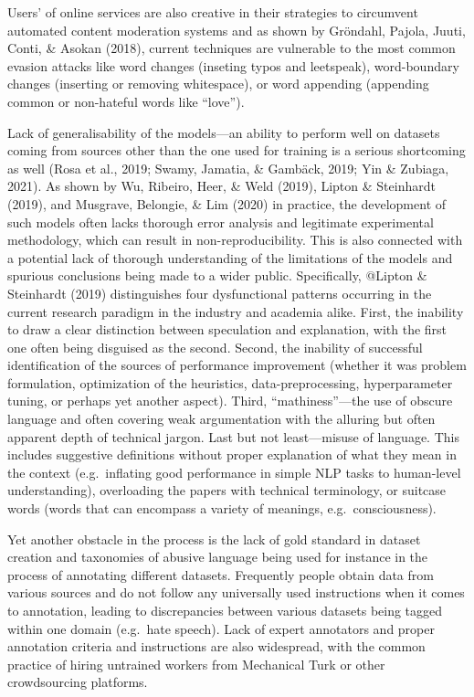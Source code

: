 \documentclass[
  10pt,
  dvipsnames,enabledeprecatedfontcommands]{scrartcl}
\begin{document}
Users' of online
services are also creative in their strategies to circumvent automated
content moderation systems and as shown by Gröndahl, Pajola, Juuti,
Conti, \& Asokan (2018), current techniques are vulnerable to the most
common evasion attacks like word changes (inseting typos and leetspeak),
word-boundary changes (inserting or removing whitespace), or word
appending (appending common or non-hateful words like ``love'').

Lack of
generalisability of the models---an ability to perform well on datasets
coming from sources other than the one used for training is a serious
shortcoming as well (Rosa et al., 2019; Swamy, Jamatia, \& Gambäck,
2019; Yin \& Zubiaga, 2021). As shown by Wu, Ribeiro, Heer, \& Weld
(2019), Lipton \& Steinhardt (2019), and Musgrave, Belongie, \& Lim
(2020) in practice, the development of such models often lacks thorough
error analysis and legitimate experimental methodology, which can result
in non-reproducibility. This is also connected with a potential lack of
thorough understanding of the limitations of the models and spurious
conclusions being made to a wider public. Specifically, @Lipton \&
Steinhardt (2019) distinguishes four dysfunctional patterns occurring in
the current research paradigm in the industry and academia alike. First,
the inability to draw a clear distinction between speculation and
explanation, with the first one often being disguised as the
second. Second, the inability of successful
identification of the sources of performance improvement (whether it was
problem formulation, optimization of the heuristics, data-preprocessing,
hyperparameter tuning, or perhaps yet another
aspect). Third, ``mathiness''---the use of obscure
language and often covering weak argumentation with the alluring but
often apparent depth of technical jargon. Last but
not least---misuse of language. This includes
suggestive definitions without proper explanation of what they mean in
the context (e.g.~inflating good performance in simple NLP tasks to
human-level understanding), overloading the papers with technical
terminology, or suitcase words (words that can encompass a variety of
meanings, e.g.~consciousness).

Yet another obstacle in the process is the lack of gold standard in
dataset creation and taxonomies of abusive language being used for
instance in the process of annotating different datasets. Frequently
people obtain data from various sources and do not follow any
universally used instructions when it comes to annotation, leading to
discrepancies between various datasets being tagged within one domain
(e.g.~hate speech). Lack of expert annotators and proper annotation
criteria and instructions are also widespread, with the common practice
of hiring untrained workers from Mechanical Turk or other crowdsourcing
platforms.
\end{document}
